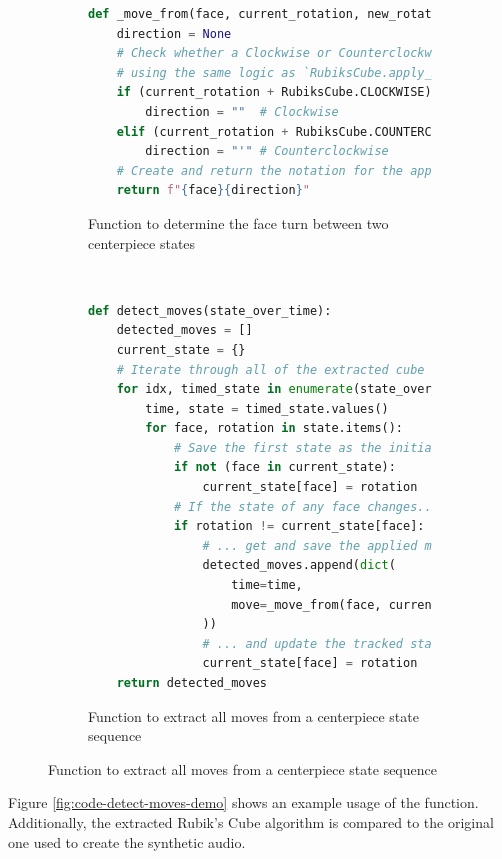 \begin{figure}[h]
\caption{Code to extract move sequences from state sequences}
\label{fig:code-extract-moves-from-state}
\begin{subfigure}{\textwidth}
\caption{Function to determine the face turn between two centerpiece states}
\label{fig:code-move-from}
\begin{lstlisting}[language=Python]
def _move_from(face, current_rotation, new_rotation):
    direction = None
    # Check whether a Clockwise or Counterclockwise turn occurred 
    # using the same logic as `RubiksCube.apply_move`
    if (current_rotation + RubiksCube.CLOCKWISE) % 4 == new_rotation:
        direction = ""  # Clockwise
    elif (current_rotation + RubiksCube.COUNTERCLOCKWISE) % 4 == new_rotation:
        direction = "'" # Counterclockwise
    # Create and return the notation for the applied face turn
    return f"{face}{direction}"
\end{lstlisting}
\vspace*{2mm}
\end{subfigure}\\
\begin{subfigure}{\textwidth}
\caption{Function to extract all moves from a centerpiece state sequence}
\label{fig:code-detect-moves}
\begin{lstlisting}[language=Python, firstnumber=last]
def detect_moves(state_over_time):
    detected_moves = []
    current_state = {}
    # Iterate through all of the extracted cube states
    for idx, timed_state in enumerate(state_over_time):
        time, state = timed_state.values()
        for face, rotation in state.items():
            # Save the first state as the initial state
            if not (face in current_state):
                current_state[face] = rotation
            # If the state of any face changes...
            if rotation != current_state[face]:
                # ... get and save the applied move with its timestamp...
                detected_moves.append(dict(
                    time=time,
                    move=_move_from(face, current_state[face], rotation)
                ))
                # ... and update the tracked state based on the new move.
                current_state[face] = rotation
    return detected_moves
\end{lstlisting}
\end{subfigure}

\end{figure}

\newpage
Figure \ref{fig:code-detect-moves-demo} shows an example usage of the  function.
Additionally, the extracted Rubik's Cube algorithm is compared to the original one used to create the synthetic audio.

